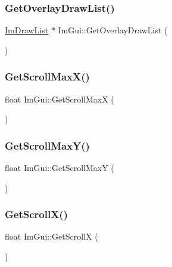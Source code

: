 \subsubsection{\texorpdfstring{Get\+Overlay\+Draw\+List()}{GetOverlayDrawList()}}
{\footnotesize\ttfamily \hyperlink{struct_im_draw_list}{Im\+Draw\+List} $\ast$ Im\+Gui\+::\+Get\+Overlay\+Draw\+List (\begin{DoxyParamCaption}{ }\end{DoxyParamCaption})}

\hypertarget{namespace_im_gui_af472cb090157c22e65a0aa1662b9f3d0}{}\label{namespace_im_gui_af472cb090157c22e65a0aa1662b9f3d0} 
\subsubsection{\texorpdfstring{Get\+Scroll\+Max\+X()}{GetScrollMaxX()}}
{\footnotesize\ttfamily float Im\+Gui\+::\+Get\+Scroll\+MaxX (\begin{DoxyParamCaption}{ }\end{DoxyParamCaption})}

\hypertarget{namespace_im_gui_ab34c0d5c63908a7ff50923151730f76a}{}\label{namespace_im_gui_ab34c0d5c63908a7ff50923151730f76a} 
\subsubsection{\texorpdfstring{Get\+Scroll\+Max\+Y()}{GetScrollMaxY()}}
{\footnotesize\ttfamily float Im\+Gui\+::\+Get\+Scroll\+MaxY (\begin{DoxyParamCaption}{ }\end{DoxyParamCaption})}

\hypertarget{namespace_im_gui_a6f88335d87da3be81dc6e24cb1812923}{}\label{namespace_im_gui_a6f88335d87da3be81dc6e24cb1812923} 
\subsubsection{\texorpdfstring{Get\+Scroll\+X()}{GetScrollX()}}
{\footnotesize\ttfamily float Im\+Gui\+::\+Get\+ScrollX (\begin{DoxyParamCaption}{ }\end{DoxyParamCaption})}

